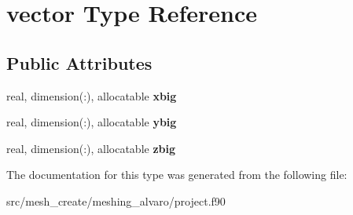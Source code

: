 \hypertarget{structvector}{\section{vector Type Reference}
\label{structvector}
}
\subsection*{Public Attributes}
\begin{DoxyCompactItemize}
\item 
\hypertarget{structvector_a73717a74d5dd2127f3065157727d4bcf}{real, dimension(\-:), allocatable {\bfseries xbig}}\label{structvector_a73717a74d5dd2127f3065157727d4bcf}

\item 
\hypertarget{structvector_ab2792b9a90e1bdc46e7c6756896be0ad}{real, dimension(\-:), allocatable {\bfseries ybig}}\label{structvector_ab2792b9a90e1bdc46e7c6756896be0ad}

\item 
\hypertarget{structvector_a840894dad104c678a2c86d908e0497a3}{real, dimension(\-:), allocatable {\bfseries zbig}}\label{structvector_a840894dad104c678a2c86d908e0497a3}

\end{DoxyCompactItemize}


The documentation for this type was generated from the following file\-:\begin{DoxyCompactItemize}
\item 
src/mesh\-\_\-create/meshing\-\_\-alvaro/project.\-f90\end{DoxyCompactItemize}
